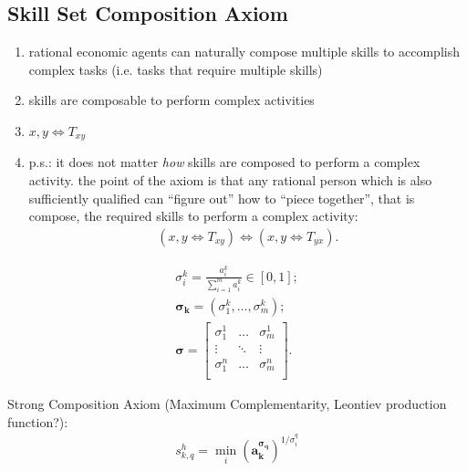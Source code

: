 \documentclass{elsarticle} %
\begin{document}
\subsection{Skill Set Composition Axiom}
\begin{enumerate}
    \item rational economic agents can naturally compose multiple skills to accomplish
          complex tasks (i.e. tasks that require multiple skills)
    \item skills are composable to perform complex activities
    \item $x,y \iff T_{xy}$
    \item p.s.: it does not matter \textit{how} skills are composed to perform a complex
          activity. the point of the axiom is that any rational person which is also
          sufficiently qualified can ``figure out'' how to ``piece together'', that is
          compose, the required skills to perform a complex activity:
          \begin{gather*}
              (x,y \iff T_{xy}) \iff (x,y \iff T_{yx})
              .
          \end{gather*}
\end{enumerate}

\begin{gather*}
    \sigma_{i}^{k} = 
    \frac{
        a_{i}^{k}
        }{
            \sum_{i=1}^{m}{
                a_{i}^{k}
            }
        }
        \in [0,1]
        ;\\
    \boldsymbol{\sigma_{k}} = 
    (\sigma_{1}^{k}, \dots, \sigma_{m}^{k})
    ;\\
    \boldsymbol{\sigma} =
    \begin{bmatrix}
        \sigma_{1}^{1} & \hdots & \sigma_{m}^{1} \\
        \vdots    & \ddots & \vdots    \\
        \sigma_{1}^{n} & \hdots & \sigma_{m}^{n} \\
    \end{bmatrix}
    .
\end{gather*}

Strong Composition Axiom (Maximum Complementarity, Leontiev production function?):
\begin{gather*}
    s_{k,q}^{h} = 
    {\min_{i}\left(
        {\boldsymbol{a_{k}^ {\boldsymbol{\sigma_{q}}}}}
    \right)} ^ {1 / \sigma_{i}^{q}}
\end{gather*}
\end{document}
